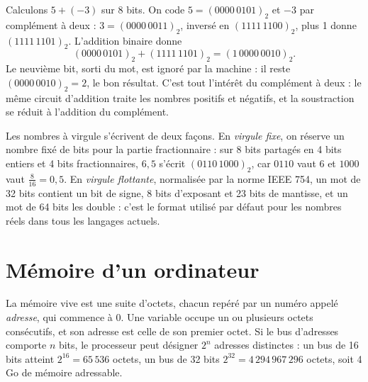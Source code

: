 \begin{exemple}
Calculons $5 + (-3)$ sur 8 bits. On code $5 = (0000\,0101)_2$ et $-3$ par complément à deux : $3 = (0000\,0011)_2$, inversé en $(1111\,1100)_2$, plus 1 donne $(1111\,1101)_2$. L'addition binaire donne
\[
(0000\,0101)_2 + (1111\,1101)_2 = (1\,0000\,0010)_2 .
\]
Le neuvième bit, sorti du mot, est ignoré par la machine : il reste $(0000\,0010)_2 = 2$, le bon résultat. C'est tout l'intérêt du complément à deux : le même circuit d'addition traite les nombres positifs et négatifs, et la soustraction se réduit à l'addition du complément.
\end{exemple}

Les nombres à virgule s'écrivent de deux façons. En \emph{virgule fixe}, on réserve un nombre fixé de bits pour la partie fractionnaire : sur 8 bits partagés en 4 bits entiers et 4 bits fractionnaires, $6{,}5$ s'écrit $(0110\,1000)_2$, car $0110$ vaut 6 et $1000$ vaut $\tfrac{8}{16} = 0{,}5$. En \emph{virgule flottante}, normalisée par la norme IEEE 754, un mot de 32 bits contient un bit de signe, 8 bits d'exposant et 23 bits de mantisse, et un mot de 64 bits les double : c'est le format utilisé par défaut pour les nombres réels dans tous les langages actuels.

\begin{center}
\label{ch4:fig:ieee}
\end{center}

\section{Mémoire d'un ordinateur}

\begin{definition}
La mémoire vive est une suite d'octets, chacun repéré par un numéro appelé \emph{adresse}, qui commence à 0. Une variable occupe un ou plusieurs octets consécutifs, et son adresse est celle de son premier octet. Si le bus d'adresses comporte $n$ bits, le processeur peut désigner $2^{n}$ adresses distinctes : un bus de 16 bits atteint $2^{16} = 65\,536$ octets, un bus de 32 bits $2^{32} = 4\,294\,967\,296$ octets, soit 4 Go de mémoire adressable.
\end{definition}

